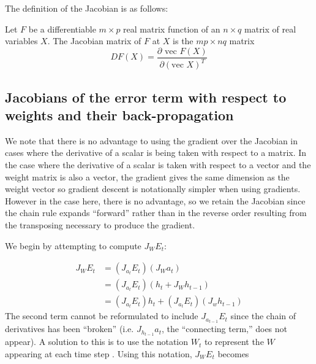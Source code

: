 The definition of the Jacobian is as follows:

\begin{definition}
  Let $F$ be a differentiable $m \times p$ real matrix function of an $n \times q$ matrix of real variables $X$. The Jacobian matrix of $F$ at $X$ is the $mp \times nq$ matrix
\begin{equation*}
  D F(X) = \frac{\partial \mbox{ vec } F(X)}{\partial (\mbox{vec } X)^T}
\end{equation*}
\cite[p. 196]{magnus2007matrix}
\end{definition}

\subsection{Jacobians of the error term with respect to weights and their back-propagation}

We note that there is no advantage to using the gradient over the Jacobian in cases where the derivative of a scalar is being taken with respect to a matrix. In the case where the derivative of a scalar is taken with respect to a vector and the weight matrix is also a vector, the gradient gives the same dimension as the weight vector so gradient descent is notationally simpler when using gradients. However in the case here, there is no advantage, so we retain the Jacobian since the chain rule expands ``forward'' rather than in the reverse order resulting from the transposing necessary to produce the gradient.

We begin by attempting to compute $J_{W} E_t$:

\begin{align*}
  J_{W} E_t & = (J_{a_t} E_t)(J_W a_t) \\
  & = (J_{a_t} E_t)(h_t + J_W h_{t-1}) \\
  & = (J_{a_t} E_t)h_t + (J_{a_t} E_t)(J_w h_{t-1})
\end{align*}
%
The second term cannot be reformulated to include $J_{a_{t-1}} E_t$ since the chain of derivatives has been ``broken'' (i.e. $J_{h_{t-1}} a_t$, the ``connecting term,'' does not appear). A solution to this is to use the notation $W_t$ to represent the $W$ appearing at each time step \cite[p. 386]{Goodfellow-et-al-2016}. Using this notation, $J_{W} E_t$ becomes

